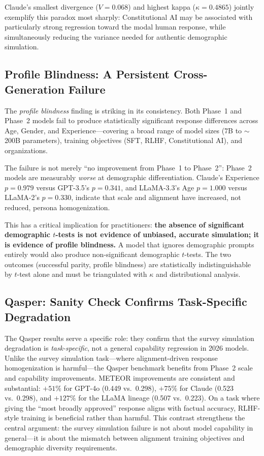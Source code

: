 \documentclass[sigconf,nonacm]{acmart}
\newcommand{\pb}{\textit{profile blindness}\xspace}
\begin{document}
Claude's smallest divergence ($V{=}0.068$) and highest kappa ($\kappa{=}0.4865$)
jointly exemplify this paradox most sharply:
Constitutional AI may be associated with particularly strong regression
toward the modal human response, while simultaneously reducing the variance
needed for authentic demographic simulation.

\subsection{Profile Blindness: A Persistent Cross-Generation Failure}
\label{sec:disc:blindness}

The \pb finding is striking in its consistency.
Both Phase~1 and Phase~2 models fail to produce statistically significant
response differences across Age, Gender, and Experience---covering a broad
range of model sizes (7B to $\sim$200B parameters), training objectives
(SFT, RLHF, Constitutional AI), and organizations.

The failure is not merely ``no improvement from Phase~1 to Phase~2'':
Phase~2 models are measurably \emph{worse} at demographic differentiation.
Claude's Experience $p{=}0.979$ versus GPT-3.5's $p{=}0.341$, and
LLaMA-3.3's Age $p{=}1.000$ versus LLaMA-2's $p{=}0.330$, indicate that
scale and alignment have increased, not reduced, persona homogenization.

This has a critical implication for practitioners: \textbf{the absence of
significant demographic $t$-tests is not evidence of unbiased, accurate
simulation; it is evidence of profile blindness.}
A model that ignores demographic prompts entirely would also produce
non-significant demographic $t$-tests.
The two outcomes (successful parity, profile blindness) are statistically
indistinguishable by $t$-test alone and must be triangulated with $\kappa$
and distributional analysis.

\subsection{Qasper: Sanity Check Confirms Task-Specific Degradation}
\label{sec:disc:qasper}

The Qasper results serve a specific role: they confirm that the survey
simulation degradation is \emph{task-specific}, not a general capability
regression in 2026 models.
Unlike the survey simulation task---where alignment-driven response
homogenization is harmful---the Qasper benchmark benefits from Phase~2
scale and capability improvements.
METEOR improvements are consistent and substantial:
$+51\%$ for GPT-4o (0.449 vs.\ 0.298),
$+75\%$ for Claude (0.523 vs.\ 0.298),
and $+127\%$ for the LLaMA lineage (0.507 vs.\ 0.223).
On a task where giving the ``most broadly approved'' response aligns with
factual accuracy, RLHF-style training is beneficial rather than harmful.
This contrast strengthens the central argument: the survey simulation
failure is not about model capability in general---it is about the
mismatch between alignment training objectives and demographic diversity
requirements.
\end{document}
